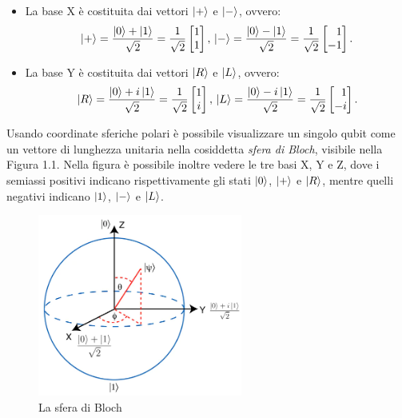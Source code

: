 \documentclass{book}
\theoremstyle{definition}
\theoremstyle{definition}
\theoremstyle{definition}
\theoremstyle{plain}
\theoremstyle{plain}
\theoremstyle{plain}
\theoremstyle{plain}
\begin{document}
\begin{itemize}
    \item La base X è costituita dai vettori $\ket{+}$ e $\ket{-}$, ovvero:
    \begin{displaymath}
    \ket{+} = \frac{\ket{0} + \ket{1}}{\sqrt{2}} = 
    \frac{1}{\sqrt{2}}
    \begin{bmatrix}
    1\\
    1
    \end{bmatrix}
    , \,
    \ket{-} = \frac{\ket{0} - \ket{1}}{\sqrt{2}} = 
    \frac{1}{\sqrt{2}}
    \begin{bmatrix*}[r]
    1\\
    -1
    \end{bmatrix*}
    .
    \end{displaymath}
    
    \item La base Y è costituita dai vettori $\ket{R}$ e $\ket{L}$, ovvero:
    \begin{displaymath}
    \ket{R} = \frac{\ket{0} + i\ket{1}}{\sqrt{2}} = 
    \frac{1}{\sqrt{2}}
    \begin{bmatrix}
    1\\
    i
    \end{bmatrix}
    , \,
    \ket{L} = \frac{\ket{0} - i\ket{1}}{\sqrt{2}} = 
    \frac{1}{\sqrt{2}}
    \begin{bmatrix*}[r]
    1\\
    -i
    \end{bmatrix*}
    .
    \end{displaymath}
\end{itemize}
Usando coordinate sferiche polari è possibile visualizzare un singolo qubit come un vettore di lunghezza unitaria nella cosiddetta \emph{sfera di Bloch}, visibile nella Figura 1.1. Nella figura è possibile inoltre vedere le tre basi X, Y e Z, dove i semiassi positivi indicano rispettivamente gli stati $\ket{0}$, $\ket{+}$ e $\ket{R}$, mentre quelli negativi indicano $\ket{1}$, $\ket{-}$ e $\ket{L}$.
\begin{figure}[H]
\captionsetup{font=scriptsize}
\begin{center}
    \includegraphics[width=0.6\textwidth]{Immagini troppo complicate/sfera_di_bloch.png}
\end{center}
\caption{\scriptsize La sfera di Bloch}\label{fig:sfera_di_bloch}
\end{figure} 
\end{document}
